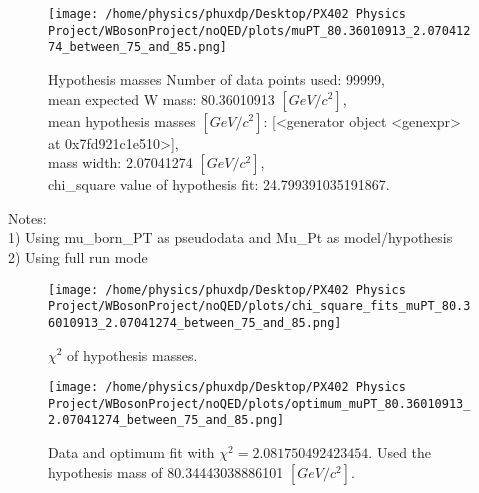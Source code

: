 \documentclass[12pt]{article}
\begin{document}
	\begin{figure}[tb]
		\centering
		\texttt{[image: /home/physics/phuxdp/Desktop/PX402 Physics Project/WBosonProject/noQED/plots/muPT\_80.36010913\_2.07041274\_between\_75\_and\_85.png]}
		\caption{\small Hypothesis masses Number of data points used: 99999,\\
mean expected W mass: 80.36010913 $[GeV/c^{2}]$,\\
mean hypothesis masses $[GeV/c^{2}]$: [<generator object <genexpr> at 0x7fd921c1e510>],\\
mass width: 2.07041274 $[GeV/c^{2}]$,\\
chi_square value of hypothesis fit: 24.799391035191867. }
		\label{fig: fig_0}
	\end{figure}
    Notes: \\
    1) Using mu\_born\_PT as pseudodata and  Mu\_Pt as model/hypothesis\\
    2) Using full run mode\\
       \begin{figure}[tb]
		\centering
		\texttt{[image: /home/physics/phuxdp/Desktop/PX402 Physics Project/WBosonProject/noQED/plots/chi\_square\_fits\_muPT\_80.36010913\_2.07041274\_between\_75\_and\_85.png]}
		\caption{\small $\chi^2$ of hypothesis masses. }
		\label{fig: fig_chi_square}
	\end{figure}

    \begin{figure}[tb]
		\centering
		\texttt{[image: /home/physics/phuxdp/Desktop/PX402 Physics Project/WBosonProject/noQED/plots/optimum\_muPT\_80.36010913\_2.07041274\_between\_75\_and\_85.png]}
		\caption{\small Data and optimum fit with $\chi^2 = 2.081750492423454$. Used the hypothesis mass of 80.34443038886101 $[GeV/c^{2}]$. }
		\label{fig: fig_optim_parms}
	\end{figure}
    
\end{document}
